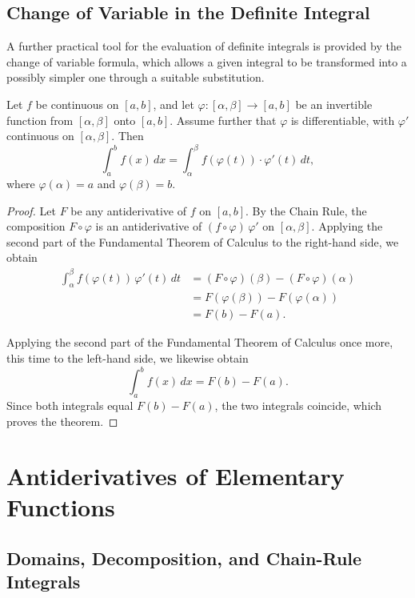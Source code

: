 \subsection{Change of Variable in the Definite Integral}

A further practical tool for the evaluation of definite integrals is provided by the change of variable formula, which allows a given integral to be transformed into a possibly simpler one through a suitable substitution.

\begin{theorem}
Let $f$ be continuous on $[a,b]$, and let $\varphi : [\alpha, \beta] \to [a,b]$ be an invertible function from $[\alpha,\beta]$ onto $[a,b]$. Assume further that $\varphi$ is differentiable, with $\varphi'$ continuous on $[\alpha,\beta]$. Then \[
\int_a^b f(x) \, dx = \int_\alpha^\beta f(\varphi(t)) \cdot \varphi'(t) \, dt,
\] where $\varphi(\alpha) = a$ and $\varphi(\beta) = b$.
\end{theorem}

\begin{proof}
Let $F$ be any antiderivative of $f$ on $[a,b]$. By the Chain Rule, the composition $F \circ \varphi$ is an antiderivative of $(f \circ \varphi) \, \varphi'$ on $[\alpha,\beta]$. Applying the second part of the Fundamental Theorem of Calculus to the right-hand side, we obtain
\[
\begin{aligned}
\int_\alpha^\beta f(\varphi(t)) \, \varphi'(t) \, dt
&= (F \circ \varphi)(\beta) - (F \circ \varphi)(\alpha) \\
&= F(\varphi(\beta)) - F(\varphi(\alpha)) \\
&= F(b) - F(a).
\end{aligned}
\]

Applying the second part of the Fundamental Theorem of Calculus once more, this time to the left-hand side, we likewise obtain
\[
\int_a^b f(x) \, dx = F(b) - F(a).
\]
Since both integrals equal $F(b) - F(a)$, the two integrals coincide, which proves the theorem.
\end{proof}

\section{Antiderivatives of Elementary Functions}

\subsection{Domains, Decomposition, and Chain-Rule Integrals}

